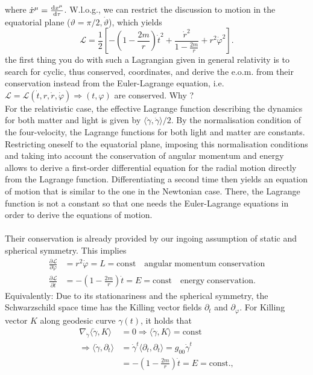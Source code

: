 	where $\dot{x}^{\mu} = \frac{\mathrm{d} x^{\mu}}{\mathrm{d} \tau}$. W.l.o.g., we can restrict the discussion to motion in the equatorial plane ($\vartheta=\pi/2,\dot{\vartheta}$), which yields
	\begin{equation}
	\mathcal{L} = \frac{1}{2} \left[-\left(1-\frac{2m}{r}\right)\dot{t}^2+\frac{\dot{r}^2}{1-\frac{2m}{r}} +r^2\dot{\varphi}^2\right].
	\end{equation}
	the first thing you do with such a Lagrangian given in general relativity is to search for cyclic, thus conserved, coordinates, and derive the e.o.m. from their conservation instead from the Euler-Lagrange equation, i.e. $\mathcal{L}=\mathcal{L}(\dot{t},r,\dot{r},\dot{\varphi})\Rightarrow (t,\varphi)$ are conserved.
Why ?\\
For the relativistic case, the effective Lagrange function describing the dynamics for both matter
and light is given by $\langle \dot{\gamma},\dot{\gamma}\rangle/2$. By the normalisation condition of the four-velocity, the Lagrange
functions for both light and matter are constants. Restricting oneself to the equatorial plane,
imposing this normalisation conditions and taking into account the conservation of angular
momentum and energy allows to derive a first-order differential equation for the radial motion
directly from the Lagrange function. Differentiating a second time then yields an equation of
motion that is similar to the one in the Newtonian case. There, the Lagrange function is not
a constant so that one needs the Euler-Lagrange equations in order to derive the equations of
motion.\\
\\
	Their conservation is already provided by our ingoing assumption of static and spherical symmetry. This implies 
	\begin{align}
		\frac{\partial \mathcal{L}}{\partial \dot{\varphi}} &= r^2 \dot{\varphi} = L = \mathrm{const} \quad \mathrm{angular \; momentum \; conservation} \\
		\frac{\partial \mathcal{L}}{\partial \dot{t}} &= - \left(1-\frac{2m}{r}\right) \dot{t} = E= \mathrm{const} \quad \mathrm{energy} \; \mathrm{conservation}.
	\end{align}
	Equivalently: Due to its stationariness and the spherical symmetry, the Schwarzschild space time has the Killing vector fields $\partial_t$ and $\partial_{\varphi}$. For Killing vector $K$ along geodesic curve $\gamma(t)$, it holds that
	\begin{align}
		\nabla_{\dot{\gamma}} \langle \dot{\gamma}, K\rangle&=0 \Rightarrow \langle \dot{\gamma},K\rangle = \mathrm{const} \\
		\Rightarrow \langle \dot{\gamma},\partial_t\rangle &= \dot{\gamma}^t \langle \partial_t, \partial_t\rangle = g_{00} \dot{\gamma}^t\\
		&=- \left(1-\frac{2m}{r}\right) \dot{t} = E= \mathrm{const.},
	\end{align}
